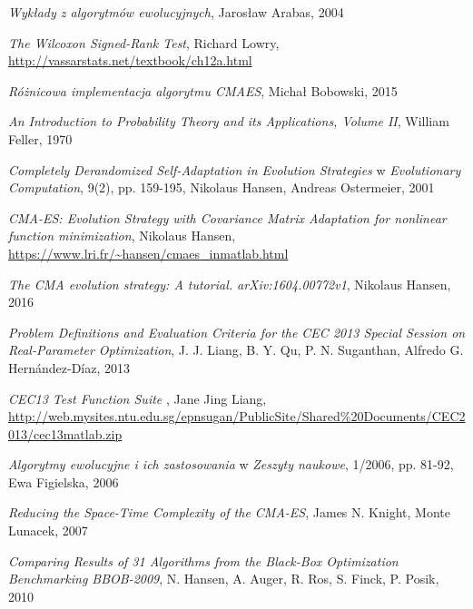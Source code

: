 \documentclass{mini}
\begin{document}
\pagebreak

\begin{thebibliography}{9}

\emph{Wykłady z algorytmów ewolucyjnych}, Jarosław Arabas, 2004

\emph{The Wilcoxon Signed-Rank Test}, Richard Lowry, \url{http://vassarstats.net/textbook/ch12a.html}

\emph{Różnicowa implementacja algorytmu CMAES}, Michał Bobowski, 2015

\emph{An Introduction to Probability Theory and its Applications, Volume II}, William Feller, 1970

\emph{Completely Derandomized Self-Adaptation in Evolution Strategies} w \emph{Evolutionary Computation}, 9(2), pp. 159-195, Nikolaus Hansen, Andreas Ostermeier, 2001

\emph{CMA-ES: Evolution Strategy with Covariance Matrix Adaptation for nonlinear function minimization}, Nikolaus Hansen, \url{https://www.lri.fr/~hansen/cmaes\_inmatlab.html}

\emph{The CMA evolution strategy: A tutorial. arXiv:1604.00772v1}, Nikolaus Hansen, 2016

\emph{Problem Definitions and Evaluation Criteria for the CEC 2013 Special Session on Real-Parameter Optimization}, J. J. Liang, B. Y. Qu, P. N. Suganthan, Alfredo G. Hernández-Díaz, 2013

\emph{CEC13 Test Function Suite }, Jane Jing Liang, \url{http://web.mysites.ntu.edu.sg/epnsugan/PublicSite/Shared%20Documents/CEC2013/cec13matlab.zip}

\emph{Algorytmy ewolucyjne i ich zastosowania} w \emph{Zeszyty naukowe}, 1/2006, pp. 81-92, Ewa Figielska, 2006

\emph{Reducing the Space-Time Complexity of the CMA-ES}, James N. Knight, Monte Lunacek, 2007

\emph{Comparing Results of 31 Algorithms from the Black-Box Optimization Benchmarking BBOB-2009}, N. Hansen, A. Auger, R. Ros, S. Finck, P. Posik, 2010

\end{thebibliography}

\makestatement
\end{document}
